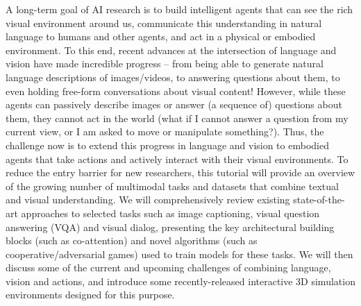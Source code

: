 A long-term goal of AI research is to build intelligent agents that can see the rich visual environment around us, communicate this understanding in natural language to humans and other agents, and act in a physical or embodied environment. To this end, recent advances at the intersection of language and vision have made incredible progress -- from being able to generate natural language descriptions of images/videos, to answering questions about them, to even holding free-form conversations about visual content! However, while these agents can passively describe images or answer (a sequence of) questions about them, they cannot act in the world (what if I cannot answer a question from my current view, or I am asked to move or manipulate something?). Thus, the challenge now is to extend this progress in language and vision to embodied agents that take actions and actively interact with their visual environments. To reduce the entry barrier for new researchers, this tutorial will provide an overview of the growing number of multimodal tasks and datasets that combine textual and visual understanding. We will comprehensively review existing state-of-the-art approaches to selected tasks such as image captioning, visual question answering (VQA) and visual dialog, presenting the key architectural building blocks (such as co-attention) and novel algorithms (such as cooperative/adversarial games) used to train models for these tasks. We will then discuss some of the current and upcoming challenges of combining language, vision and actions, and introduce some recently-released interactive 3D simulation environments designed for this purpose.
